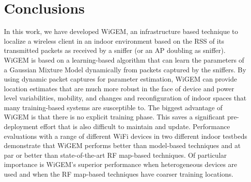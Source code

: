 
\section{Conclusions}
\label{sec:conclusions}

In this work, we have developed WiGEM, an infrastructure based technique to localize a
wireless client in an indoor environment based on the RSS
 of its transmitted packets as received by a sniffer (or an AP doubling 
as sniffer). WiGEM is based on a learning-based
algorithm that can learn the parameters of a Gaussian Mixture Model
dynamically from packets captured by the sniffers.
By using dynamic packet captures for parameter
estimation, WiGEM can provide location estimates 
that are much more robust in the face of device and power level
variabilities, mobility, and changes
and reconfiguration of indoor spaces that many training-based systems
are susceptible to. The biggest advantage of WiGEM is that there is no explicit 
training phase. This saves a significant pre-deployment effort that is also
difficult to maintain and update. Performance evaluations with 
a range of different WiFi devices in two different indoor testbeds demonstrate
that WiGEM performs better than model-based techniques and at par or better than 
state-of-the-art RF map-based techniques. Of particular importance is WiGEM's
superior performance when heterogeneous devices are used and when the RF map-based
techniques have coarser training locations. 


%
